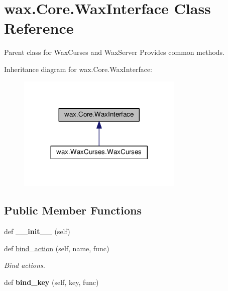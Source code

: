 \hypertarget{classwax_1_1Core_1_1WaxInterface}{}\section{wax.\+Core.\+Wax\+Interface Class Reference}
\label{classwax_1_1Core_1_1WaxInterface}


Parent class for Wax\+Curses and Wax\+Server Provides common methods.  




Inheritance diagram for wax.\+Core.\+Wax\+Interface\+:
\nopagebreak
\begin{figure}[H]
\begin{center}
\leavevmode
\includegraphics[width=224pt]{classwax_1_1Core_1_1WaxInterface__inherit__graph}
\end{center}
\end{figure}
\subsection*{Public Member Functions}
\begin{DoxyCompactItemize}
\item 
def {\bfseries \+\_\+\+\_\+init\+\_\+\+\_\+} (self)\hypertarget{classwax_1_1Core_1_1WaxInterface_a9494be173be6e980524d2e2527583f0b}{}\label{classwax_1_1Core_1_1WaxInterface_a9494be173be6e980524d2e2527583f0b}

\item 
def \hyperlink{classwax_1_1Core_1_1WaxInterface_af10d87f79dc119f4d5f30cd70ef9feb9}{bind\+\_\+action} (self, name, func)
\begin{DoxyCompactList}\small\item\em Bind actions. \end{DoxyCompactList}\item 
def {\bfseries bind\+\_\+key} (self, key, func)\hypertarget{classwax_1_1Core_1_1WaxInterface_a58dd4d72ef0a9123e85ea22f90e48797}{}\label{classwax_1_1Core_1_1WaxInterface_a58dd4d72ef0a9123e85ea22f90e48797}

\end{DoxyCompactItemize}


